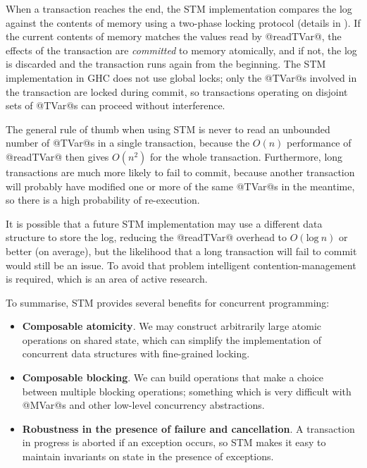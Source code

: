 When a transaction reaches the end, the STM implementation compares
the log against the contents of memory using a two-phase locking
protocol (details in \citet{stm}).  If the current contents of memory
matches the values read by @readTVar@, the effects of the transaction
are \emph{committed} to memory atomically, and if not, the log is
discarded and the transaction runs again from the beginning.  The STM
implementation in GHC does not use global locks; only the @TVar@s
involved in the transaction are locked during commit, so transactions
operating on disjoint sets of @TVar@s can proceed without
interference.

The general rule of thumb when using STM is never to read an unbounded
number of @TVar@s in a single transaction, because the $O(n)$
performance of @readTVar@ then gives $O(n^2)$ for the whole
transaction.  Furthermore, long transactions are much more likely to
fail to commit, because another transaction will probably have
modified one or more of the same @TVar@s in the meantime, so there is
a high probability of re-execution.

It is possible that a future STM implementation may use a different
data structure to store the log, reducing the @readTVar@ overhead to
$O(\mbox{log}~n)$ or better (on average), but the likelihood that a
long transaction will fail to commit would still be an issue.  To
avoid that problem intelligent contention-management is required,
which is an area of active research.



To summarise, STM provides several benefits for concurrent
programming:

\begin{itemize}
\item \textbf{Composable atomicity}.  We may construct arbitrarily large atomic
  operations on shared state, which can simplify the implementation of
  concurrent data structures with fine-grained locking.
\item \textbf{Composable blocking}.  We can build operations that make
  a choice between multiple blocking operations; something which is
  very difficult with @MVar@s and other low-level concurrency
  abstractions.
\item \textbf{Robustness in the presence of failure and cancellation}.
  A transaction in progress is aborted if an exception occurs, so STM
  makes it easy to maintain invariants on state in the presence of
  exceptions.
\end{itemize}

